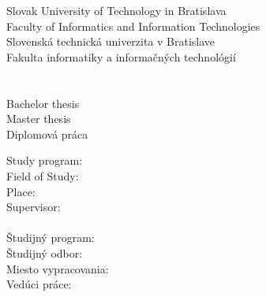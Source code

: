 \newpage
\begin{center}
\thispagestyle{empty}
{
	{\Large Slovak University of Technology in Bratislava}\textbf{}\\
	{\Large Faculty of Informatics and Information Technologies}\textbf{}\\[\baselineskip]
}
{
	{\Large Slovenská technická univerzita v Bratislave}\textbf{}\\
	{\Large Fakulta informatiky a informačných technológií}\textbf{}\\[\baselineskip]
}
\vspace*{5cm}
{\Large \Author}\textbf{}\\[\baselineskip]
{\huge \Title}\textbf{}\\[\baselineskip]
{
	{
		{\large Bachelor thesis}\\
	}
	{
		{\large Master thesis}\\
	}
}
{
	{\large Diplomová práca}\\
}
\end{center}
\vspace*{4.5cm}
{
	Study program: \Program\\ 
	Field of Study: \Field\\
	Place: \Place\\
	Supervisor: \Supervisor \\\\
}
{
	Študijný program: \Program\\ 
	Študijný odbor: \Field\\
	Miesto vypracovania: \Place\\
	Vedúci práce: \Supervisor \\\\
}
\Month\ \Year
\newpage
\null